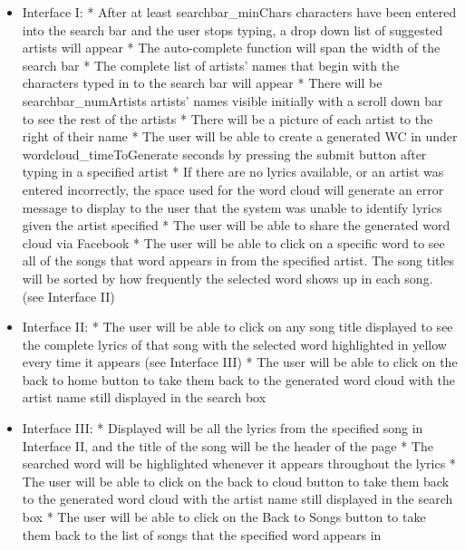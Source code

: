 \documentclass[]{article}
\begin{document}
\begin{itemize}
  \begin{itemize}
  \itemsep1pt\parskip0pt
  \item
    Interface I: * After at least searchbar\_minChars characters have
    been entered into the search bar and the user stops typing, a drop
    down list of suggested artists will appear * The auto-complete
    function will span the width of the search bar * The complete list
    of artists' names that begin with the characters typed in to the
    search bar will appear * There will be searchbar\_numArtists
    artists' names visible initially with a scroll down bar to see the
    rest of the artists * There will be a picture of each artist to the
    right of their name * The user will be able to create a generated WC
    in under wordcloud\_timeToGenerate seconds by pressing the submit
    button after typing in a specified artist * If there are no lyrics
    available, or an artist was entered incorrectly, the space used for
    the word cloud will generate an error message to display to the user
    that the system was unable to identify lyrics given the artist
    specified * The user will be able to share the generated word cloud
    via Facebook * The user will be able to click on a specific word to
    see all of the songs that word appears in from the specified artist.
    The song titles will be sorted by how frequently the selected word
    shows up in each song. (see Interface II)
  \item
    Interface II: * The user will be able to click on any song title
    displayed to see the complete lyrics of that song with the selected
    word highlighted in yellow every time it appears (see Interface III)
    * The user will be able to click on the back to home button to take
    them back to the generated word cloud with the artist name still
    displayed in the search box
  \item
    Interface III: * Displayed will be all the lyrics from the specified
    song in Interface II, and the title of the song will be the header
    of the page * The searched word will be highlighted whenever it
    appears throughout the lyrics * The user will be able to click on
    the back to cloud button to take them back to the generated word
    cloud with the artist name still displayed in the search box * The
    user will be able to click on the Back to Songs button to take them
    back to the list of songs that the specified word appears in
  \end{itemize}
\end{itemize}
\end{document}
